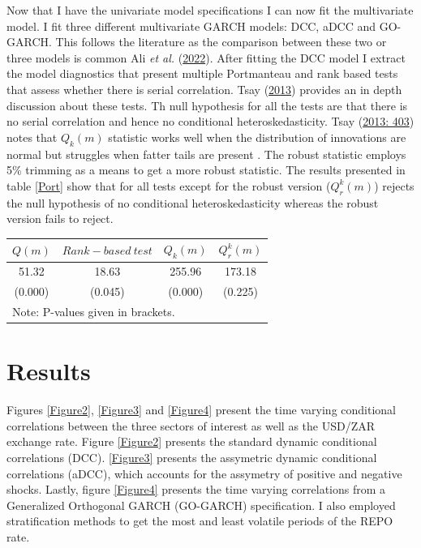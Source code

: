 \documentclass[12pt,preprint, authoryear]{elsarticle}
\let\origtable\table
\let\endorigtable\endtable
\renewenvironment{table}[1][2] {
    \expandafter\origtable\expandafter[H]
} {
    \endorigtable
}
\numberwithin{equation}{section}
\numberwithin{figure}{section}
\numberwithin{table}{section}
\begin{document}
Now that I have the univariate model specifications I can now fit the
multivariate model. I fit three different multivariate GARCH models:
DCC, aDCC and GO-GARCH. This follows the literature as the comparison
between these two or three models is common Ali \emph{et al.}
(\protect\hyperlink{ref-ali2022modelling}{2022}). After fitting the DCC
model I extract the model diagnostics that present multiple Portmanteau
and rank based tests that assess whether there is serial correlation.
Tsay (\protect\hyperlink{ref-tsay2013}{2013}) provides an in depth
discussion about these tests. Th null hypothesis for all the tests are
that there is no serial correlation and hence no conditional
heteroskedasticity. Tsay (\protect\hyperlink{ref-tsay2013}{2013: 403})
notes that \(Q_k (m)\) statistic works well when the distribution of
innovations are normal but struggles when fatter tails are present . The
robust statistic employs 5\% trimming as a means to get a more robust
statistic. The results presented in table \ref{Port} show that for all
tests except for the robust version (\(Q_r^{k} (m)\)) rejects the null
hypothesis of no conditional heteroskedasticity whereas the robust
version fails to reject.

\begin{table}[htbp]
\centering
\caption{Portmanteau tests}
\label{Port}
\begin{tabular}{|c|c|c|c|}
\hline
$Q(m)$ & $Rank-based \ test$ & $Q_k(m)$ & $Q_r^{k} (m)$ \\
\hline
\hline
51.32 & 18.63 & 255.96 & 173.18 \\
(0.000) & (0.045) & (0.000) & (0.225) \\
\hline
\multicolumn{4}{|l|}{Note: P-values given in brackets.} \\
\hline
\end{tabular}
\end{table}

\hypertarget{results}{%
\section{Results}\label{results}}

Figures \ref{Figure2}, \ref{Figure3} and \ref{Figure4} present the time
varying conditional correlations between the three sectors of interest
as well as the USD/ZAR exchange rate. Figure \ref{Figure2} presents the
standard dynamic conditional correlations (DCC). \ref{Figure3} presents
the assymetric dynamic conditional correlations (aDCC), which accounts
for the assymetry of positive and negative shocks. Lastly, figure
\ref{Figure4} presents the time varying correlations from a Generalized
Orthogonal GARCH (GO-GARCH) specification. I also employed
stratification methods to get the most and least volatile periods of the
REPO rate.
\end{document}

